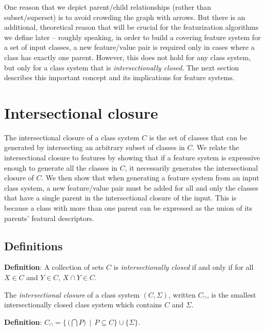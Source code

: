 \documentclass[12pt, oneside]{article}   	%
\begin{document}
One reason that we depict parent/child relationships (rather than subset/superset) is to avoid crowding the graph with arrows. But there is an additional, theoretical reason that will be crucial for the featurization algorithms we define later -- roughly speaking, in order to build a covering feature system for a set of input classes, a new feature/value pair is required only in cases where a class has exactly one parent. However, this does not hold for any class system, but only for a class system that is \textit{intersectionally closed}. The next section describes this important concept and its implications for feature systems.

\FloatBarrier
\section{Intersectional closure}
\label{sec:intersectional}

The intersectional closure of a class system $C$ is the set of classes that can be generated by intersecting an arbitrary subset of classes in $C$. We relate the intersectional closure to features by showing that if a feature system is expressive enough to generate all the classes in $C$, it necessarily generates the intersectional closure of $C$. We then show that when generating a feature system from an input class system, a new feature/value pair must be added for all and only the classes that have a single parent in the intersectional closure of the input. This is because a class with more than one parent can be expressed as the union of its parents' featural descriptors.

\subsection{Definitions}

\textbf{Definition}: A collection of sets $C$ is \textit{intersectionally closed} if and only if for all $X \in C$ and $Y \in C$, $X \cap Y \in C$.

\vspace{\baselineskip} \noindent The \textit{intersectional closure} of a class system $(C, \Sigma)$, written $C_\cap$, is the smallest intersectionally closed class system which contains $C$ and $\Sigma$.

\vspace{\baselineskip} \noindent \textbf{Definition}: $C_\cap = \{ \, \big( \bigcap P \big) \, \mid \, P \subseteq C\} \cup \{\Sigma\}$.
\end{document}
